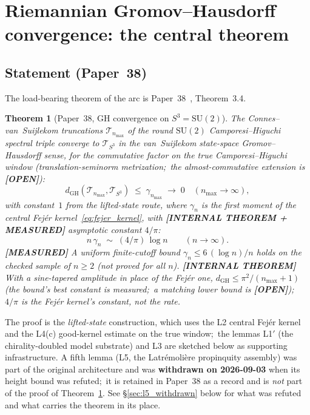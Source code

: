 \documentclass[11pt,a4paper]{article}
\theoremstyle{plain}
\newtheorem{theorem}{Theorem}[section]
\theoremstyle{definition}
\newcommand{\nmax}{n_{\max}}
\newcommand{\sthree}{S^{3}}
\newcommand{\Tcal}{\mathcal{T}}
\newcommand{\SU}{\mathrm{SU}}
\newcommand{\gvc}[2]{#2}
\begin{document}
\section{Riemannian Gromov--Hausdorff convergence: the central
theorem}
\label{sec:gh}

\subsection{Statement (Paper~38)}

The load-bearing theorem of the arc is Paper~38~\cite{paper38},
Theorem~3.4.

\begin{theorem}[Paper~38, GH convergence on $\sthree = \SU(2)$]
\label{thm:gh_su2}
\gvc{wh1-p38-gh-convergence}{The Connes--van~Suijlekom truncations $\Tcal_{\nmax}$ of the round
$\SU(2)$ Camporesi--Higuchi spectral triple converge to
$\Tcal_{\sthree}$ in the van~Suijlekom state-space
Gromov--Hausdorff sense, for the commutative factor on the true
Camporesi--Higuchi window (translation-seminorm metrization;\ the
almost-commutative extension is \textbf{[OPEN]})}:
\begin{equation}
d_{\mathrm{GH}}(\Tcal_{\nmax}, \Tcal_{\sthree})
\;\le\;
\gamma_{\nmax} \;\to\; 0
\quad (\nmax \to \infty),
\label{eq:gh_su2}
\end{equation}
with constant~$1$ from the lifted-state route, where $\gamma_{n}$ is the
first moment of the central Fej\'er kernel~\eqref{eq:fejer_kernel}, with
\textbf{[INTERNAL THEOREM + MEASURED]} asymptotic constant $4/\pi$:
\begin{equation}
n \,\gamma_{n} \;\sim\; (4/\pi)\,\log n
\qquad (n \to \infty).
\label{eq:gh_rate_constant}
\end{equation}
\textbf{[MEASURED]} A uniform finite-cutoff bound $\gamma_{n} \le 6\,(\log n)/n$
holds on the checked sample of $n \ge 2$ (not proved for all $n$).
\textbf{[INTERNAL THEOREM]} With a sine-tapered amplitude in place of the Fej\'er one, $d_{\mathrm{GH}} \le \pi^2/(\nmax+1)$ (the bound's best constant is measured;\ a matching lower bound is \textbf{[OPEN]});\ $4/\pi$ is the Fej\'er kernel's constant, not the rate.
\end{theorem}

The proof is the \emph{lifted-state} construction, which uses the L2
central Fej\'er kernel and the L4(c) good-kernel estimate on the true
window;\ the lemmas L1$'$ (the chirality-doubled model substrate) and L3
are sketched below as supporting infrastructure.  A fifth lemma (L5, the Latr\'emoli\`ere
propinquity assembly) was part of the original architecture and was
\textbf{withdrawn on 2026-09-03} when its height bound was refuted;\ it
is retained in Paper~38 as a record and is \emph{not} part of the proof
of Theorem~\ref{thm:gh_su2}.  See \S\ref{sec:l5_withdrawn} below for what
was refuted and what carries the theorem in its place.
\end{document}
